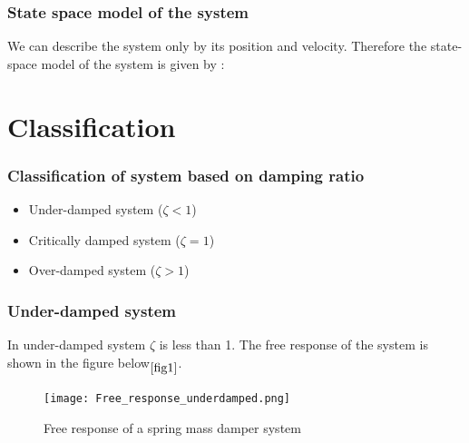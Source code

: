 \documentclass[10pt]{beamer}
\begin{document}
\begin{frame}
\frametitle{State space model of the system}
We can describe the system only by its position and velocity. Therefore the state-space model
of the system is given by :

\end{frame}

\section{Classification}

\begin{frame}
\frametitle{Classification of system based on damping ratio}
\begin{itemize}
	\item{Under-damped system ($\zeta < 1$)}
	\item{Critically damped system ($\zeta = 1$)}
	\item{Over-damped system ($\zeta > 1$)}
\end{itemize}
\end{frame}

\begin{frame}
\frametitle{Under-damped system}
In under-damped system $\zeta$ is less than 1.
The free response of the system is shown in the figure below$\phantom{}_{\ref{fig1}}$.

\begin{figure}[h]
	\centering
	\texttt{[image: Free\_response\_underdamped.png]}
	\caption{Free response of a spring mass damper system}
\end{figure}
\label{fig1}

\end{frame}
 
\end{document}
